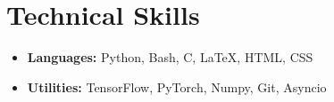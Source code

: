 \section*{Technical Skills}
\begin{itemize}[itemsep=0mm]

\item \textbf{Languages:} Python, Bash, C, \LaTeX, HTML, CSS
\item \textbf{Utilities:} TensorFlow, PyTorch, Numpy, Git, Asyncio

\end{itemize}
